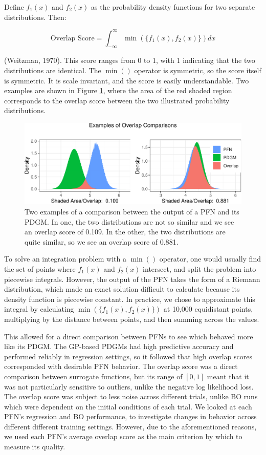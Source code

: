 \documentclass[12pt,twoside]{reedthesis}
\begin{document}
Define \(f_1(x)\) and \(f_2(x)\) as the probability density functions for two separate distributions. Then:

\[\text{Overlap Score} = \int_{-\infty}^\infty\min\left(\{f_1(x),f_2(x)\}\right)dx\]

(Weitzman, 1970). This score ranges from 0 to 1, with 1 indicating that the two distributions are identical. The \(\min()\) operator is symmetric, so the score itself is symmetric. It is scale invariant, and the score is easily understandable. Two examples are shown in Figure \ref{fig:example-overlap}, where the area of the red shaded region corresponds to the overlap score between the two illustrated probability distributions.
\begin{figure}
\centering
\includegraphics{thesis_files/figure-latex/example-overlap-1.pdf}
\caption{\label{fig:example-overlap}Two examples of a comparison between the output of a PFN and its PDGM. In one, the two distributions are not so similar and we see an overlap score of 0.109. In the other, the two distributions are quite similar, so we see an overlap score of 0.881.}
\end{figure}
To solve an integration problem with a \(\min()\) operator, one would usually find the set of points where \(f_1(x)\) and \(f_2(x)\) intersect, and split the problem into piecewise integrals. However, the output of the PFN takes the form of a Riemann distribution, which made an exact solution difficult to calculate because its density function is piecewise constant. In practice, we chose to approximate this integral by calculating \(\min\left(\{f_1(x),f_2(x)\}\right)\) at 10,000 equidistant points, multiplying by the distance between points, and then summing across the values.

This allowed for a direct comparison between PFNs to see which behaved more like its PDGM. The GP-based PDGMs had high predictive accuracy and performed reliably in regression settings, so it followed that high overlap scores corresponded with desirable PFN behavior. The overlap score was a direct comparison between surrogate functions, but its range of \([0,1]\) meant that it was not particularly sensitive to outliers, unlike the negative log likelihood loss. The overlap score was subject to less noise across different trials, unlike BO runs which were dependent on the initial conditions of each trial. We looked at each PFN's regression and BO performance, to investigate changes in behavior across different different training settings. However, due to the aforementioned reasons, we used each PFN's average overlap score as the main criterion by which to measure its quality.
\end{document}
